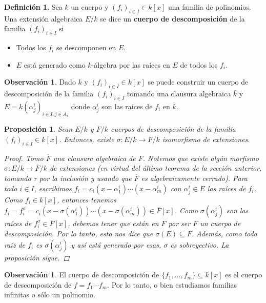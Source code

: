 \documentclass[12pt]{book}
\newtheorem{prop}[teo]{Proposición}
\theoremstyle{definition}
\newtheorem{obs}[teo]{Observación}
\newtheorem{defn}[teo]{Definición}
\begin{document}
\begin{defn}
Sea $k$ un cuerpo y $(f_i)_{i\in I}\in k[x]$ una familia de polinomios. Una extensión algebraica $E/k$ se dice un \textbf{cuerpo de descomposición} de la familia $(f_i)_{i\in I}$ si \begin{itemize}\item Todos los $f_i$ se descomponen en $E$.\item $E$ está generado como $k$-álgebra por las raíces en $E$ de todos los $f_i$. \end{itemize}
\end{defn}

\begin{obs}
Dado $k$ y $(f_i)_{i\in I}\in k[x]$ se puede construir un cuerpo de descomposición de la familia $(f_i)_{i\in I}$ tomando una clausura algebraica $\overline{k}$ y $E=k(\alpha_j^{i})_{i\in I, j\in A_i}$ donde $\alpha_j^{i}$ son las raíces de $f_i$ en $\overline{k}$.
\end{obs}

\begin{prop}
Sean $E/k$ y $F/k$ cuerpos de descomposición de la familia $(f_i)_{i\in I}\in k[x]$. Entonces, existe $\sigma:E/k\to F/k$ isomorfismo de extensiones.
\begin{proof}
Tomo $\overline{F}$ una clausura algebraica de $F$. Notemos que existe algún morfismo $\sigma:E/k\to \overline{F}/k$ de extensiones (en virtud del último teorema de la sección anterior, tomando $\tau$ por la inclusión y usando que $\overline{F}$ es algebraicamente cerrado).  Para todo $i\in I$, escribimos $f_i = c_i (x - \alpha_1^i)\cdots (x - \alpha_m^i)$ con $\alpha_j^i\in E$ las raíces de $f_i$. Como $f_i\in k[x]$, entonces tenemos $f_i = f_i^\sigma = c_i (x - \sigma(\alpha_1^i))\cdots (x - \sigma(\alpha_m^i))\in\overline{F}[x]$. Como $\sigma(\alpha_j^i)$ son las raíces de $f_i^\sigma\in \overline{F}[x]$, debemos tener que están en $F$ por ser $F$ un cuerpo de descomposición. Por lo tanto, esto nos dice que $\sigma(E)\subseteq F$. Además, como toda raíz de $f_i$ es $\sigma(\alpha_j^i)$ y así está generado por esas, $\sigma$ es sobreyectivo. La proposición sigue.
\end{proof}
\end{prop}

\begin{obs}
El cuerpo de descomposición de $\{f_1,\ldots ,f_m\}\subseteq k[x]$ es el cuerpo de descomposición de $f=f_1\cdots f_m$. Por lo tanto, o bien estudiamos familias infinitas o sólo un polinomio.
\end{obs}
\end{document}
